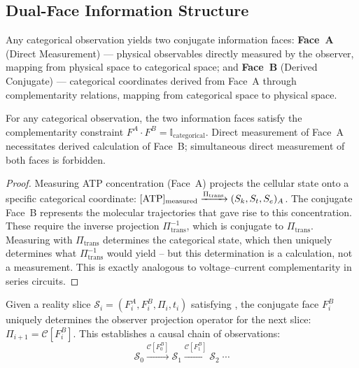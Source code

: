 \subsection{Dual-Face Information Structure}

\begin{definition}
Any categorical observation yields two conjugate information faces:
\textbf{Face~A} (Direct Measurement) --- physical observables directly measured
by the observer, mapping from physical space to categorical space; and
\textbf{Face~B} (Derived Conjugate) --- categorical coordinates derived from
Face~A through complementarity relations, mapping from categorical space to
physical space.
\end{definition}

\begin{theorem}
\label{thm:face-complementarity}
For any categorical observation, the two information faces satisfy the
complementarity constraint $F^A \cdot F^B = \mathbb{I}_\mathrm{categorical}$.
Direct measurement of Face~A necessitates derived calculation of Face~B;
simultaneous direct measurement of both faces is forbidden.
\end{theorem}

\begin{proof}
Measuring ATP concentration (Face~A) projects the cellular state onto a
specific categorical coordinate: $[\mathrm{ATP}]_\mathrm{measured}
\xrightarrow{\Pi_\mathrm{trans}} (S_k, S_t, S_e)_A$.  The conjugate Face~B
represents the molecular trajectories that gave rise to this concentration.
These require the inverse projection $\Pi_\mathrm{trans}^{-1}$, which is
conjugate to $\Pi_\mathrm{trans}$.  Measuring with $\Pi_\mathrm{trans}$
determines the categorical state, which then uniquely determines what
$\Pi_\mathrm{trans}^{-1}$ would yield -- but this determination is a
calculation, not a measurement.  This is exactly analogous to voltage--current
complementarity in series circuits.
\end{proof}

\begin{theorem}
\label{thm:catalytic-slicing}
Given a reality slice $\mathcal{S}_i = (F_i^A, F_i^B, \Pi_i, t_i)$ satisfying
, the conjugate face $F_i^B$ uniquely determines
the observer projection operator for the next slice:
$\Pi_{i+1} = \mathcal{C}[F_i^B]$.
This establishes a causal chain of observations:
\[
    \mathcal{S}_0 \xrightarrow{\mathcal{C}[F_0^B]} \mathcal{S}_1
    \xrightarrow{\mathcal{C}[F_1^B]} \mathcal{S}_2 \;\cdots
\]
\end{theorem}

